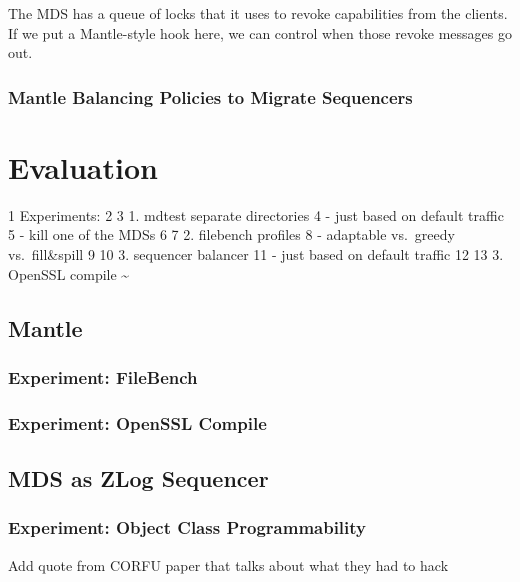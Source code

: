 \documentclass[10pt,twocolumn]{article}
\begin{document}
The MDS has a queue of locks that it uses to revoke capabilities from
the clients. If we put a Mantle-style hook here, we can control when
those revoke messages go out.

\subsubsection{Mantle Balancing Policies to Migrate
Sequencers}\label{mantle-balancing-policies-to-migrate-sequencers}

\section{Evaluation}\label{evaluation}

1 Experiments: 2 3 1. mdtest separate directories 4 - just based on
default traffic 5 - kill one of the MDSs 6 7 2. filebench profiles 8 -
adaptable vs.~greedy vs.~fill\&spill 9 10 3. sequencer balancer 11 -
just based on default traffic 12 13 3. OpenSSL compile
\textasciitilde{}\\\label{evaluation}

\subsection{Mantle}\label{mantle}

\subsubsection{Experiment: FileBench}\label{experiment-filebench}

\subsubsection{Experiment: OpenSSL
Compile}\label{experiment-openssl-compile}

\subsection{MDS as ZLog Sequencer}\label{mds-as-zlog-sequencer}

\subsubsection{Experiment: Object Class
Programmability}\label{experiment-object-class-programmability}

Add quote from CORFU paper that talks about what they had to hack
\end{document}
